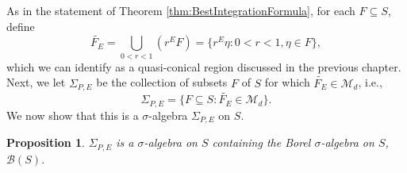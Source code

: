 \documentclass[11pt, letter]{book}
\newtheorem{proposition}[theorem]{Proposition}
\begin{document}
\noindent As in the statement of Theorem \ref{thm:BestIntegrationFormula}, for each $F\subseteq S$, define
\begin{equation*}
\widetilde{F_E}=\bigcup_{0<r<1}\left(r^E F\right)=\{r^E\eta:0<r<1,\eta\in F\},
\end{equation*}
which we can identify as a quasi-conical region discussed in the previous chapter. Next, we let $\Sigma_{P,E}$ be the collection of subsets $F$ of $S$ for which $\widetilde{F_E}\in\mathcal{M}_d$, i.e.,  
\begin{equation*}
\Sigma_{P,E}=\{F\subseteq S:\widetilde{F_E}\in\mathcal{M}_d\}.
\end{equation*}
We now show that this is a $\sigma$-algebra $\Sigma_{P,E}$ on $S$. 

\begin{framed}
\begin{proposition}\label{prop:BorelContainment}
$\Sigma_{P,E}$ is a $\sigma$-algebra on $S$ containing the Borel $\sigma$-algebra on $S$, $\mathcal{B}(S)$.
\end{proposition}
\end{framed}
\end{document}
